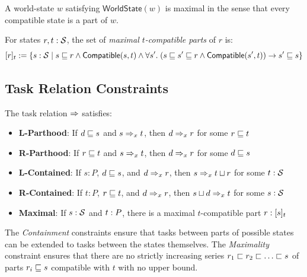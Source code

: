 \documentclass[../LogosReference.tex]{subfiles}
\begin{document}
\begin{remark}
A world-state $w$ satisfying $\mathsf{WorldState}(w)$ is maximal in the sense that every compatible state is a part of $w$.
\end{remark}

\begin{definition}\label{def:maximal-compatible}
For states $r, t : \mathcal{S}$, the set of \emph{maximal $t$-compatible parts} of $r$ is:
\[
    [r]_{t} := \{s : \mathcal{S} \mid s \sqsubseteq r \land \mathsf{Compatible}(s, t) \land \forall s'.\; (s \sqsubseteq s' \sqsubseteq r \land \mathsf{Compatible}(s', t)) \to s' \sqsubseteq s\}
\]
\end{definition}


\subsection{Task Relation Constraints}\label{sec:task-constraints}

\begin{definition}\label{def:task-constraints}
	The task relation $\Rightarrow$ satisfies:
	\begin{itemize}
    \item \textbf{L-Parthood}: If $d \sqsubseteq s$ and $s \Rightarrow_{x} t$, then $d \Rightarrow_{x} r$ for some $r \sqsubseteq t$
    \item \textbf{R-Parthood}: If $r \sqsubseteq t$ and $s \Rightarrow_{x} t$, then $d \Rightarrow_{x} r$ for some $d \sqsubseteq s$
    \item \textbf{L-Contained}: If $s : P$, $d \sqsubseteq s$, and $d \Rightarrow_{x} r$, then $s \Rightarrow_{x} t\sqcup r$ for some $t : \mathcal{S}$
    \item \textbf{R-Contained}: If $t : P$, $r \sqsubseteq t$, and $d \Rightarrow_{x} r$, then $s\sqcup d \Rightarrow_{x} t$ for some $s : \mathcal{S}$
    \item \textbf{Maximal}: If $s : \mathcal{S}$ and $t : P$, there is a maximal $t$-compatible part $r : [s]_{t}$
	\end{itemize}
\end{definition}

\begin{remark}
	The \textit{Containment} constraints ensure that tasks between parts of possible states can be extended to tasks between the states themselves.
	The \textit{Maximality} constraint ensures that there are no strictly increasing series $r_1 \sqsubset r_2 \sqsubset \ldots \sqsubset s$ of parts $r_i \sqsubseteq s$ compatible with $t$ with no upper bound.
\end{remark}
\end{document}
